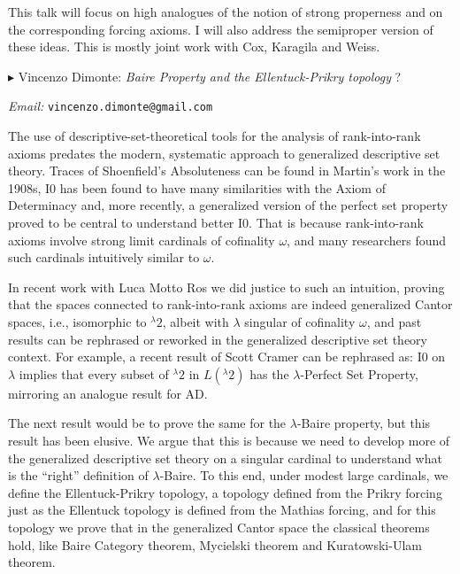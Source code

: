 \documentclass[a4paper]{amsart}
\theoremstyle{remark}
\newcommand{\vsp}{\vspace{20pt}}
\begin{document}
This talk will focus on high analogues of the notion of strong properness and on the corresponding forcing axioms. I will also address the semiproper version of these ideas. This is mostly joint work with Cox, Karagila and Weiss.





\vsp 

\noindent 
$\blacktriangleright$ Vincenzo Dimonte: \emph{Baire Property and the Ellentuck-Prikry topology} 
\noindent 
?

\noindent 
\emph{Email:} \texttt{vincenzo.dimonte@gmail.com}

The use of descriptive-set-theoretical tools for the analysis of rank-into-rank axioms predates the modern, systematic approach to generalized descriptive set theory. Traces of Shoenfield's Absoluteness can be found in Martin's work in the 1908s, I0 has been found to have many similarities with the Axiom of Determinacy and, more recently, a generalized version of the perfect set property proved to be central to understand better I0. That is because rank-into-rank axioms involve strong limit cardinals of cofinality $\omega$, and many researchers found such cardinals intuitively similar to $\omega$.

In recent work with Luca Motto Ros we did justice to such an intuition, proving that the spaces connected to rank-into-rank axioms are indeed generalized Cantor spaces, i.e., isomorphic to ${}^\lambda 2$, albeit with $\lambda$ singular of cofinality $\omega$, and past results can be rephrased or reworked in the generalized descriptive set theory context. For example, a recent result of Scott Cramer can be rephrased as: I0 on $\lambda$ implies that every subset of ${}^\lambda 2$ in $L({}^\lambda 2)$ has the $\lambda$-Perfect Set Property, mirroring an analogue result for AD.

The next result would be to prove the same for the $\lambda$-Baire property, but this result has been elusive. We argue that this is because we need to develop more of the generalized descriptive set theory on a singular cardinal to understand what is the ``right'' definition of $\lambda$-Baire. To this end, under modest large cardinals, we define the Ellentuck-Prikry topology, a topology defined from the Prikry forcing just as the Ellentuck topology is defined from the Mathias forcing, and for this topology we prove that in the generalized Cantor space the classical theorems hold, like Baire Category theorem, Mycielski theorem and Kuratowski-Ulam theorem.  
\end{document}
